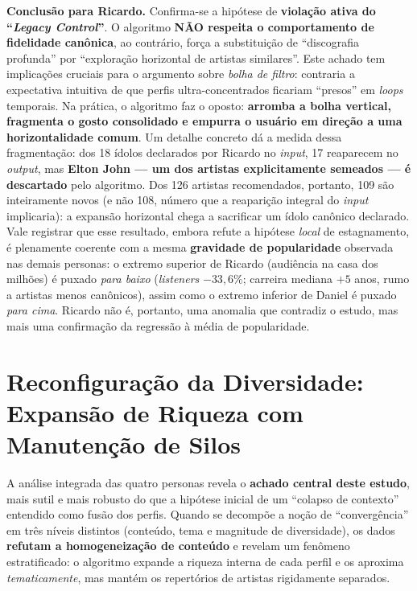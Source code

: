 \documentclass[12pt, %
openright,
oneside, %
a4paper,    %
english,   %
brazil]{facom-ufu-abntex2}
\begin{document}
\textbf{Conclusão para Ricardo.} Confirma-se a hipótese de \textbf{violação ativa
do ``\emph{Legacy Control}''}. O algoritmo \textbf{NÃO respeita o comportamento de
fidelidade canônica}, ao contrário, força a substituição de ``discografia
profunda'' por ``exploração horizontal de artistas similares''. Este achado tem
implicações cruciais para o argumento sobre \emph{bolha de filtro}: contraria a
expectativa intuitiva de que perfis ultra-concentrados ficariam ``presos'' em
\emph{loops} temporais. Na prática, o algoritmo faz o oposto: \textbf{arromba a
bolha vertical, fragmenta o gosto consolidado e empurra o usuário em direção a uma
horizontalidade comum}. Um detalhe concreto dá a medida dessa fragmentação: dos
18 ídolos declarados por Ricardo no \emph{input}, 17 reaparecem no \emph{output},
mas \textbf{Elton John --- um dos artistas explicitamente semeados --- é
descartado} pelo algoritmo. Dos 126 artistas recomendados, portanto, 109 são
inteiramente novos (e não 108, número que a reaparição integral do \emph{input}
implicaria): a expansão horizontal chega a sacrificar um ídolo canônico
declarado. Vale registrar que esse resultado, embora refute a
hipótese \emph{local} de estagnamento, é plenamente coerente com a mesma
\textbf{gravidade de popularidade} observada nas demais personas: o extremo
superior de Ricardo (audiência na casa dos milhões) é puxado \emph{para baixo}
(\emph{listeners} $-33{,}6\%$; carreira mediana $+5$ anos, rumo a artistas menos
canônicos), assim como o extremo inferior de Daniel é puxado \emph{para cima}.
Ricardo não é, portanto, uma anomalia que contradiz o estudo, mas mais uma
confirmação da regressão à média de popularidade.

\section{Reconfiguração da Diversidade: Expansão de Riqueza com Manutenção de Silos}
\label{sec:diversidade-output}

A análise integrada das quatro personas revela o \textbf{achado central deste
estudo}, mais sutil e mais robusto do que a hipótese inicial de um ``colapso
de contexto'' entendido como fusão dos perfis. Quando se decompõe a noção de
``convergência'' em três níveis distintos (conteúdo, tema e magnitude de
diversidade), os dados \textbf{refutam a homogeneização de conteúdo} e revelam um
fenômeno estratificado: o algoritmo expande a riqueza interna de cada perfil e os
aproxima \emph{tematicamente}, mas mantém os repertórios de artistas rigidamente
separados.
\end{document}
